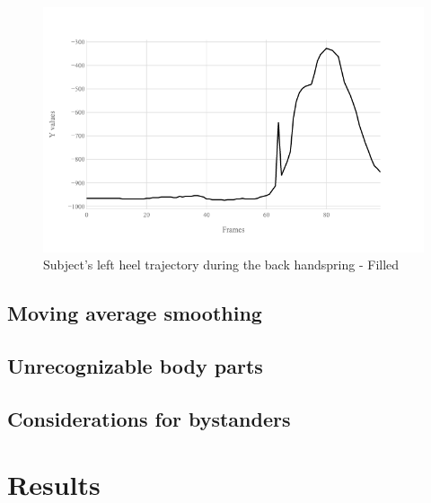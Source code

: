 \begin{figure}[htb]
  \centering
    \includegraphics[width=\textwidth,keepaspectratio]
    {images/data-preprocessing/flack-17-rasmus-l-heel-y-filled}
    \caption{Subject's left heel trajectory during the back handspring - Filled}
    \label{lack-17-rasmus-l-heel-y-filled}
\end{figure}

\subsection{Moving average smoothing}

\subsection{Unrecognizable body parts}

\subsection{Considerations for bystanders}

\section{Results}
\label{pre-processing-results}



